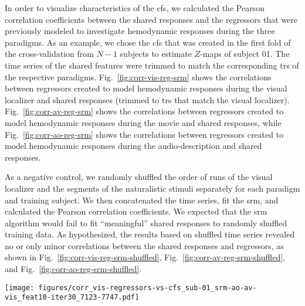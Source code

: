 In order to visualize characteristics of the \ac{cfs}, we calculated the Pearson
correlation coefficients between the shared responses and the regressors that
were previously modeled \citep[cf.][]{sengupta2016extension,
haeusler2022processing} to investigate hemodynamic responses during the three
paradigms.
%
As an example, we chose the \ac{cfs} that was created in the first fold of the
cross-validation from $N-1$ subjects to estimate $Z$-maps of subject 01.
%
The time series of the shared features were trimmed to match the corresponding
\acp{tr} of the respective paradigms.
%
Fig.~\ref{fig:corr-vis-reg-srm} shows the correlations between regressors
created to model hemodynamic responses during the visual localizer and shared
responses (trimmed to \acp{tr} that match the visual localizer).
Fig.~\ref{fig:corr-av-reg-srm} shows the correlations between regressors created
to model hemodynamic responses during the movie \citep[cf. Table 3
in][]{haeusler2022processing} and shared responses, while
Fig.~\ref{fig:corr-ao-reg-srm} shows the correlations between regressors created
to model hemodynamic responses during the audio-description \citep[cf. Table 3
in][]{haeusler2022processing} and shared responses.




As a negative control, we randomly shuffled the order of runs of the visual
localizer and the segments of the naturalistic stimuli separately for each
paradigm and training subject. We then concatenated the time series, fit the
\ac{srm}, and calculated the Pearson correlation coefficients.
%
We expected that the \ac{srm} algorithm would fail to fit ``meaningful''
 shared responses to randomly shuffled training data.
%
As hypothesized, the results based on shuffled time series revealed no or only
minor correlations between the shared responses and regressors, as shown in
Fig.~\ref{fig:corr-vis-reg-srm-shuffled},
Fig.~\ref{fig:corr-av-reg-srm-shuffled}, and
Fig.~\ref{fig:corr-ao-reg-srm-shuffled}.




\begin{figure*}[tbp]
\centering
\texttt{[image: figures/corr\_vis-regressors-vs-cfs\_sub-01\_srm-ao-av-vis\_feat10-iter30\_7123-7747.pdf]}
\caption{
%
\textbf{Pearson correlation coefficients between regressors of the visual
localizer and shared features.}
%
The time series of the shared features within the multi-paradigm \ac{cfs}
%
(as calculated for subject 01 in the first fold of the cross-validation)
%
were trimmed to match the corresponding \acp{tr} of the visual localizer
paradigm \citep{sengupta2016extension}.
%
The six regressors of the visual localizer model hemodynamic responses to
the six categories of pictures that were presented in blocks.
}
\label{fig:corr-vis-reg-srm}
\end{figure*}


